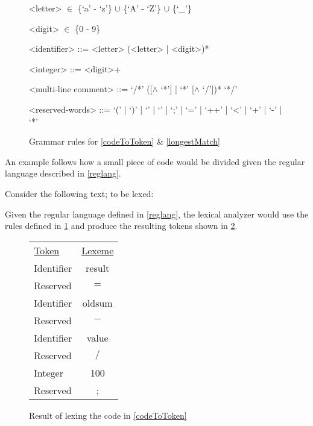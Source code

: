 \begin{figure}[h!]
\begin{center}
\begin{grammar}

<letter>  $\in$ \{`a' - `z'\} $\cup$ \{`A' - `Z'\} $\cup$ \{`_'\}

<digit>  $\in$ \{0 - 9\}

<identifier> ::= <letter> (<letter> | <digit>)* 

<integer> ::= <digit>+

<multi-line comment> ::= `/*' ([$\wedge$ `*'] | `*' [$\wedge$ `/'])* `*/'

<reserved-words> ::= `(' | `)' | `{' | `}' | `;' | `=' | `++' | `<' | `+' | `-' | `*'

\end{grammar}
\caption{Grammar rules for \cref{codeToToken} \& \cref{longestMatch}\label{fig:grammar}}
\end{center}
\end{figure}

An example follows how a small piece of code would be divided given the regular
language described in \cref{reglang}.

\newpage

\begin{example} \label{codeToToken}$ $\\
Consider the following text; to be lexed:

Given the regular language defined in \cref{reglang}, the lexical analyzer would
use the rules defined in \cref{fig:grammar} and produce the resulting
tokens shown in \cref{fig:codeToToken}.

\begin{figure}[h!]
\begin{center}
\begin{tabular}{l c}
\underline{Token} & \underline{Lexeme}\\
Identifier & result\\
Reserved & $=$\\
Identifier & oldsum\\
Reserved & $-$\\
Identifier & value\\
Reserved & $/$\\
Integer & 100\\
Reserved & ;
\end{tabular}
\end{center}
\caption{Result of lexing the code in \cref{codeToToken} \label{fig:codeToToken}}
\end{figure}
\end{example}

